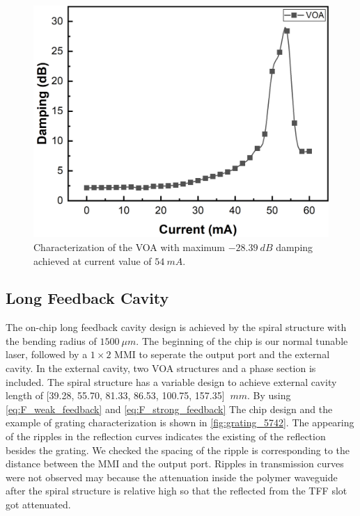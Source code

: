 
\begin{figure}[ht]
    \centering
    \includegraphics[width=0.55\linewidth]{figures/VOA_18321.png}
    \caption{Characterization of the VOA with maximum $-28.39 \ dB$ damping achieved at current value of $54 \ mA$.}
    \label{fig:VOA_18321}
\end{figure}

\subsection{Long Feedback Cavity} \label{subsec:long_feedback_cavity}
The on-chip long feedback cavity design is achieved by the spiral structure with the bending radius of $1500 \ \mu m$. The beginning of the chip is our normal tunable laser, followed by a $1\times 2$ MMI to seperate the output port and the external cavity. In the external cavity, two VOA structures and a phase section is included. The spiral structure has a variable design to achieve external cavity length of [39.28, 55.70, 81.33, 86.53, 100.75, 157.35] $\ mm$. By using \autoref{eq:F_weak_feedback} and \autoref{eq:F_strong_feedback} 
The chip design and the example of grating characterization is shown in \autoref{fig:grating_5742}. The appearing of the ripples in the reflection curves indicates the existing of the reflection besides the grating. We checked the spacing of the ripple is corresponding to the distance between the MMI and the output port. Ripples in transmission curves were not observed may because the attenuation inside the polymer waveguide after the spiral structure is relative high so that the reflected from the TFF slot got attenuated.

